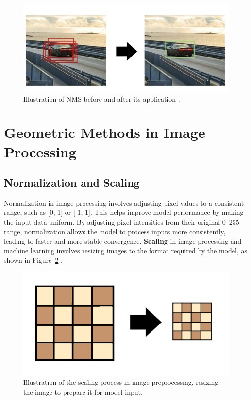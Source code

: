 \begin{figure}[h!]
    \centering
    \includegraphics[width=0.75\linewidth]{figures/theory/image-recognition/nms.png}
    \caption[NMS before and after]{Illustration of NMS before and after its application \cite{thepythoncode:nms}.}
    \label{fig:nms}
\end{figure}

\section{Geometric Methods in Image Processing}
\label{sec:geometric-methods}


\subsection*{Normalization and Scaling}
\label{subsec:normalization-and-scaling}

Normalization in image processing involves adjusting pixel values to a consistent range, such as [0, 1] or [-1, 1]. This helps improve model performance by making the input data uniform. By adjusting pixel intensities from their original 0–255 range, normalization allows the model to process inputs more consistently, leading to faster and more stable convergence.
\textbf{Scaling} in image processing and machine learning involves resizing images to the format required by the model, as shown in Figure~\ref{fig:scaling} \cite{brownlee:normalization}. 

\begin{figure}[h!]
    \centering
    \includegraphics[width=0.75\linewidth]{figures/theory/image-recognition/scaling.png}
    \caption[Scaling before and after]{Illustration of the scaling process in image preprocessing, resizing the image to prepare it for model input.}
    \label{fig:scaling}
\end{figure}


